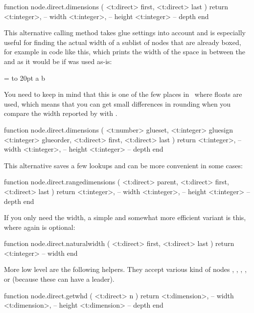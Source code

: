 \starttyping[option=LUA]
function node.direct.dimensions (
    <t:direct> first,
    <t:direct> last
)
    return
        <t:integer>, -- width
        <t:integer>, -- height
        <t:integer>  -- depth
end
\stoptyping

This alternative calling method takes glue settings into account and is especially useful for
finding the actual width of a sublist of nodes that are already boxed, for
example in code like this, which prints the width of the space in between the
 and  as it would be if  was used as-is:

\starttyping
{} = \hbox to 20pt {a b}

\stoptyping

You need to keep in mind that this is one of the few places in \TEX\ where floats
are used, which means that you can get small differences in rounding when you
compare the width reported by  with .

\starttyping[option=LUA]
function node.direct.dimensions (
    <t:number>  glueset,
    <t:integer> gluesign
    <t:integer> glueorder,
    <t:direct>  first,
    <t:direct>  last
)
    return
        <t:integer>, -- width
        <t:integer>, -- height
        <t:integer>  -- depth
end
\stoptyping

This alternative saves a few lookups and can be more convenient in some
cases:

\starttyping[option=LUA]
function node.direct.rangedimensions (
    <t:direct> parent,
    <t:direct> first,
    <t:direct> last
)
    return
        <t:integer>, -- width
        <t:integer>, -- height
        <t:integer>  -- depth
end
\stoptyping

If you only need the width, a simple and somewhat more efficient variant is this,
where again  is optional:

\starttyping[option=LUA]
function node.direct.naturalwidth (
    <t:direct> first,
    <t:direct> last
)
    return <t:integer> -- width
end
\stoptyping

More low level are the following helpers. They accept various kind of nodes
, , , ,  or 
(because these can have a leader).

\starttyping[option=LUA]
function node.direct.getwhd ( <t:direct> n )
    return
        <t:dimension>, -- width
        <t:dimension>, -- height
        <t:dimension>  -- depth
end
\stoptyping

